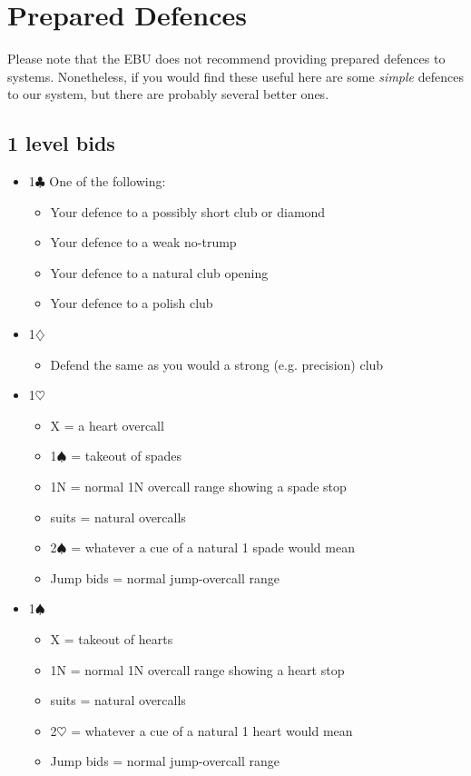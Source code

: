 \section{Prepared Defences}
\label{appx:defences}

Please note that the EBU does not recommend providing prepared defences to
systems.  Nonetheless, if you would find these useful here are some {\em simple}
defences to our system, but there are probably several better ones.

\subsection{1 level bids}

\begin{itemize}
\item 1$\clubsuit$
	One of the following:
	\begin{itemize}
	\item Your defence to a possibly short club or diamond
	\item Your defence to a weak no-trump
	\item Your defence to a natural club opening 
	\item Your defence to a polish club
	\end{itemize}
\item 1$\diamondsuit$
	\begin{itemize}
	\item Defend the same as you would a strong (e.g. precision) club
	\end{itemize}
\item 1$\heartsuit$
	\begin{itemize}
	\item X = a heart overcall
	\item 1$\spadesuit$ = takeout of spades
	\item 1N = normal 1N overcall range showing a spade stop
	\item suits = natural overcalls
	\item 2$\spadesuit$ = whatever a cue of a natural 1 spade would mean 
	\item Jump bids = normal jump-overcall range
	\end{itemize}
\item 1$\spadesuit$
	\begin{itemize}
	\item X = takeout of hearts
	\item 1N = normal 1N overcall range showing a heart stop
	\item suits = natural overcalls
	\item 2$\heartsuit$ = whatever a cue of a natural 1 heart would mean 
	\item Jump bids = normal jump-overcall range
	\end{itemize}


\end{itemize}
